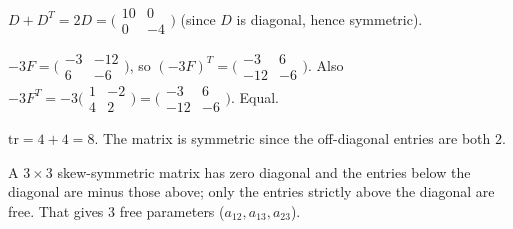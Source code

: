 \begin{solutions}
  \item $D + D^{T} = 2 D = \bigl(\begin{smallmatrix} 10 & 0 \\ 0 & -4 \end{smallmatrix}\bigr)$ (since $D$ is diagonal, hence symmetric).

  \item $-3 F = \bigl(\begin{smallmatrix} -3 & -12 \\ 6 & -6 \end{smallmatrix}\bigr)$, so $(-3 F)^{T} = \bigl(\begin{smallmatrix} -3 & 6 \\ -12 & -6 \end{smallmatrix}\bigr)$. Also $-3 F^{T} = -3 \bigl(\begin{smallmatrix} 1 & -2 \\ 4 & 2 \end{smallmatrix}\bigr) = \bigl(\begin{smallmatrix} -3 & 6 \\ -12 & -6 \end{smallmatrix}\bigr)$. Equal.

  \item $\mathrm{tr} = 4 + 4 = 8$. The matrix is symmetric since the off-diagonal entries are both $2$.

  \item A $3 \times 3$ skew-symmetric matrix has zero diagonal and the entries below the diagonal are minus those above; only the entries strictly above the diagonal are free. That gives $3$ free parameters ($a_{12}, a_{13}, a_{23}$).
\end{solutions}
